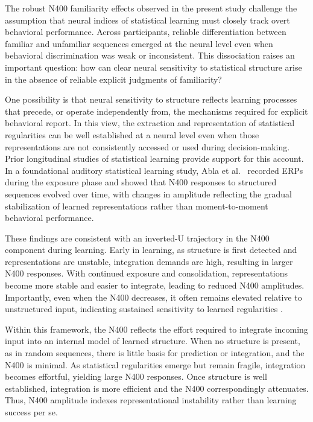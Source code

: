 The robust N400 familiarity effects observed in the present study challenge the assumption that neural indices of statistical learning must closely track overt behavioral performance. Across participants, reliable differentiation between familiar and unfamiliar sequences emerged at the neural level even when behavioral discrimination was weak or inconsistent. This dissociation raises an important question: how can clear neural sensitivity to statistical structure arise in the absence of reliable explicit judgments of familiarity?

One possibility is that neural sensitivity to structure reflects learning processes that precede, or operate independently from, the mechanisms required for explicit behavioral report. In this view, the extraction and representation of statistical regularities can be well established at a neural level even when those representations are not consistently accessed or used during decision-making. Prior longitudinal studies of statistical learning provide support for this account. In a foundational auditory statistical learning study, Abla et al.\ \cite{ablaOnlineAssessmentStatistical2008} recorded ERPs during the exposure phase and showed that N400 responses to structured sequences evolved over time, with changes in amplitude reflecting the gradual stabilization of learned representations rather than moment-to-moment behavioral performance.

These findings are consistent with an inverted-U trajectory in the N400 component during learning. Early in learning, as structure is first detected and representations are unstable, integration demands are high, resulting in larger N400 responses. With continued exposure and consolidation, representations become more stable and easier to integrate, leading to reduced N400 amplitudes. Importantly, even when the N400 decreases, it often remains elevated relative to unstructured input, indicating sustained sensitivity to learned regularities \cite{cunilleraTimeCourseFunctional2009}.

Within this framework, the N400 reflects the effort required to integrate incoming input into an internal model of learned structure. When no structure is present, as in random sequences, there is little basis for prediction or integration, and the N400 is minimal. As statistical regularities emerge but remain fragile, integration becomes effortful, yielding large N400 responses. Once structure is well established, integration is more efficient and the N400 correspondingly attenuates. Thus, N400 amplitude indexes representational instability rather than learning success per se.

